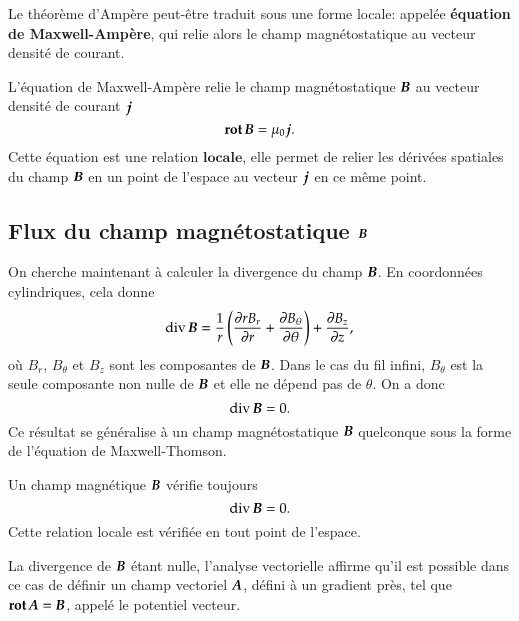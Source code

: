 Le théorème d'Ampère peut-être traduit sous une forme locale:
appelée \textbf{équation de Maxwell-Ampère}, qui relie alors le champ magnétostatique
au vecteur densité de courant.

\begin{defn}
	L'équation de Maxwell-Ampère relie le champ magnétostatique $\vecb$
	au vecteur densité de courant $\vecj$
	\begin{equation}
		\rot \vecb = \mu_0 \vecj.
		\label{eq:magneto_ma}
	\end{equation}
	Cette équation est une relation $\textbf{locale}$, elle permet de relier 
	les dérivées spatiales du champ $\vecb$ en un point de l'espace au vecteur
	$\vecj$ en ce même point.
\end{defn}

\subsection{Flux du champ magnétostatique $\vecb$}
On cherche maintenant à calculer la divergence du champ $\vecb$. En coordonnées 
cylindriques, cela donne
\begin{equation*}
	\div \vecb = \dfrac{1}{r}\left(\dd{r B_r}{r} + \dd{B_\theta}{\theta} \right)
	+ \dd{B_z}{z},
\end{equation*}
où $B_r$, $B_\theta$ et $B_z$ sont les composantes de $\vecb$. 
Dans le cas du fil infini, $B_\theta$ est la seule composante non nulle de $\vecb$ 
et elle ne dépend pas
de $\theta$. On a donc
\begin{equation*}
	\div \vecb = 0.
\end{equation*}
Ce résultat se généralise à un champ magnétostatique $\vecb$ quelconque sous
la forme de l'équation de Maxwell-Thomson.

\begin{defn}
	Un champ magnétique $\vecb$ vérifie toujours
	\begin{equation*}
		\div \vecb = 0.
	\end{equation*}
	Cette relation locale est vérifiée en tout point de l'espace.
\end{defn}

\begin{rema}
La divergence de $\vecb$ étant nulle, l'analyse vectorielle affirme
qu'il est possible dans ce cas de définir un champ vectoriel $\veca$,
défini à un gradient près, tel que $\rot \veca = \vecb$,
appelé le potentiel vecteur.
\end{rema}

